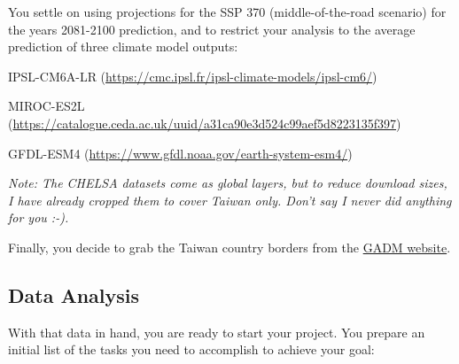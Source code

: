 \documentclass[
  letterpaper,
  DIV=11,
  numbers=noendperiod]{scrreprt}
\begin{document}
You settle on using projections for the SSP 370 (middle-of-the-road
scenario) for the years 2081-2100 prediction, and to restrict your
analysis to the average prediction of three climate model outputs:

IPSL-CM6A-LR (\url{https://cmc.ipsl.fr/ipsl-climate-models/ipsl-cm6/})

MIROC-ES2L
(\href{info:\%20https://catalogue.ceda.ac.uk/uuid/a31ca90e3d524c99aef5d8223135f397}{https://catalogue.ceda.ac.uk/uuid/a31ca90e3d524c99aef5d8223135f397})

GFDL-ESM4 (\url{https://www.gfdl.noaa.gov/earth-system-esm4/})

\emph{Note: The CHELSA datasets come as global layers, but to reduce
download sizes, I have already cropped them to cover Taiwan only. Don't
say I never did anything for you :-).}

Finally, you decide to grab the Taiwan country borders from the
\href{https://gadm.org/download_country.html}{GADM website}.

\subsection{Data Analysis}\label{data-analysis}

With that data in hand, you are ready to start your project. You prepare
an initial list of the tasks you need to accomplish to achieve your
goal:
\end{document}
